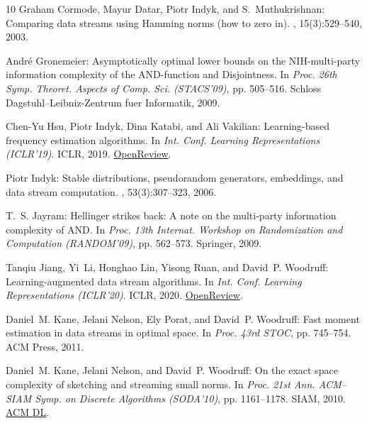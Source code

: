 \documentclass[11pt]{article}
\numberwithin{equation}{section}
\theoremstyle{definition}
\theoremstyle{plain}
\begin{document}
\begin{thebibliography}{10}
{\sc Graham Cormode, Mayur Datar, Piotr Indyk, and S.~Muthukrishnan}: Comparing
  data streams using {H}amming norms (how to zero in).
, 15(3):529--540, 2003.

{\sc Andr{\'{e}} Gronemeier}: Asymptotically optimal lower bounds on the
  {NIH}-multi-party information complexity of the {AND}-function and
  {D}isjointness.
\newblock In {\em Proc. 26th Symp. Theoret. Aspects of Comp. Sci. (STACS'09)},
  pp. 505--516. Schloss Dagstuhl--Leibniz-Zentrum fuer Informatik, 2009.

{\sc Chen-Yu Hsu, Piotr Indyk, Dina Katabi, and Ali Vakilian}: Learning-based
  frequency estimation algorithms.
\newblock In {\em Int. Conf. Learning Representations (ICLR'19)}. ICLR, 2019.
\newblock \href{https://openreview.net/forum?id=r1lohoCqY7}{OpenReview}.

{\sc Piotr Indyk}: Stable distributions, pseudorandom generators, embeddings,
  and data stream computation.
, 53(3):307--323, 2006.
\newblock [\epfmtdoi{10.1145/1147954.1147955}]

{\sc T.~S. Jayram}: Hellinger strikes back: {A} note on the multi-party
  information complexity of {AND}.
\newblock In {\em Proc. 13th Internat. Workshop on Randomization and
  Computation (RANDOM'09)}, pp. 562--573. Springer, 2009.
\newblock [\epfmtdoi{10.1007/978-3-642-03685-9\_42}]

{\sc Tanqiu Jiang, Yi~Li, Honghao Lin, Yisong Ruan, and David~P. Woodruff}:
  Learning-augmented data stream algorithms.
\newblock In {\em Int. Conf. Learning Representations (ICLR'20)}. ICLR, 2020.
\newblock \href{https://openreview.net/forum?id=HyxJ1xBYDH}{OpenReview}.

{\sc Daniel~M. Kane, Jelani Nelson, Ely Porat, and David~P. Woodruff}: Fast
  moment estimation in data streams in optimal space.
\newblock In {\em Proc. 43rd STOC}, pp. 745--754. ACM Press, 2011.

{\sc Daniel~M. Kane, Jelani Nelson, and David~P. Woodruff}: On the exact space
  complexity of sketching and streaming small norms.
\newblock In {\em Proc. 21st Ann. ACM--SIAM Symp. on Discrete Algorithms
  (SODA'10)}, pp. 1161--1178. SIAM, 2010.
\newblock \href{https://dl.acm.org/doi/10.5555/1873601.1873694}{ACM DL}.


\end{thebibliography}
\end{document}
